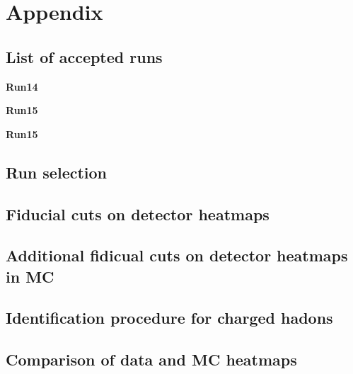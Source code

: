 \newpage

\section*{Appendix}

\setcounter{subsection}{0}

\renewcommand\thesubsection{\Alph{subsection}}

\subsection{List of accepted runs}
\label{appendix:accepted_runs}
\noindent
\flushleft
\textbf{Run14 \HeAu}



\textbf{Run15 \pAl}



\textbf{Run15 \pAu}



\newpage

\subsection{Run selection}
\label{appendix:run_selection}


\subsection{Fiducial cuts on detector heatmaps}
\label{appendix:deadmaps}


\subsection{Additional fidicual cuts on detector heatmaps in MC}
\label{appendix:additional_mc_deadmaps}


\subsection{Identification procedure for charged hadons}
\label{appendix:identification_procedure}


\subsection{Comparison of data and MC heatmaps}
\label{appendix:deadmaps_comparison}
%

\newpage
